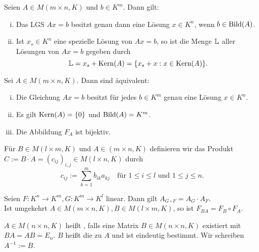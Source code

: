 \setcounter{definition}{7}
\begin{satz}
	\label{satz:I.6.8}
	Seien $A \in M(m\times n,K)$ und $b \in K^m$.
	Dann gilt:
	\begin{enumerate}[(i)]
		\item Das LGS $Ax = b$ besitzt genau dann eine Lösung $x \in K^n$, wenn $b \in \operatorname{Bild}(A)$.
		\item Ist $x_s \in K^n$ eine spezielle Lösung von $Ax=b$, so ist die Menge $\mathbb{L}$ aller Lösungen von $Ax=b$ gegeben durch
		\[
			\mathbb{L} = x_s + \operatorname{Kern}(A) = \{x_s + x : x \in \operatorname{Kern}(A)\}.
		\]
	\end{enumerate}
\end{satz}
\newpage
\begin{korollar}
	\label{folg:I.6.9}
	Sei $A \in M(m\times n,K)$.
	Dann sind äquivalent:
	\begin{enumerate}[(i)]
		\item Die Gleichung $Ax=b$ besitzt für jedes $b \in K^m$ genau eine Lösung $x \in K^n$.
		\item Es gilt $\operatorname{Kern}(A) = \{0\}$ und $\operatorname{Bild}(A) = K^m$.
		\item Die Abbildung $F_A$ ist bijektiv.
	\end{enumerate}
\end{korollar}

\setcounter{definition}{12}
\begin{definition}[Matrixmultiplikation]
	\label{def:I.6.13}
	Für $B \in M(l \times m,K)$ und $A \in (m \times n,K)$ definieren wir das Produkt $C := B \cdot A = (c_{ij})_{i,j} \in M(l \times n,K)$ durch 
	\[
		c_{ij} := \sum_{k=1}^{m} b_{ik}a_{kj} \quad \text{für } 1 \leq i \leq l \text{ und } 1 \leq j \leq n.
	\]
\end{definition}

\begin{satz}
	\label{satz:I.6.14}
	Seien $F \colon K^n \rightarrow K^m, G \colon K^m \rightarrow K^l$ linear.
	Dann gilt $A_{G \circ F} = A_G \cdot A_F$. \\
	Ist umgekehrt $A \in M(m \times n,K), B \in M(l \times m,K)$, so ist $F_{BA} = F_B \circ F_A$.
\end{satz}

\setcounter{definition}{16}
\begin{definition}
	\label{def:I.6.17}
	$A \in M(n \times n,K)$ heißt , falls eine Matrix $B \in M(n\times n,K)$ existiert mit $BA = AB = E_n$.
	$B$ heißt die zu $A$  und ist eindeutig bestimmt.
	Wir schreiben $A^{-1} := B$.
\end{definition}

